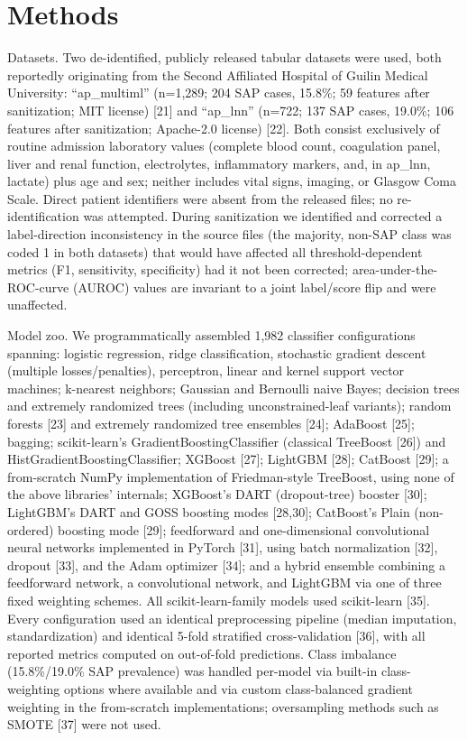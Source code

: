 \documentclass[10pt]{article} %
\begin{document}
\section{Methods}

Datasets. Two de-identified, publicly released tabular datasets were used, both reportedly originating from the Second Affiliated Hospital of Guilin Medical University: ``ap\_multiml'' (n=1,289; 204 SAP cases, 15.8\%; 59 features after sanitization; MIT license) [21] and ``ap\_lnn'' (n=722; 137 SAP cases, 19.0\%; 106 features after sanitization; Apache-2.0 license) [22]. Both consist exclusively of routine admission laboratory values (complete blood count, coagulation panel, liver and renal function, electrolytes, inflammatory markers, and, in ap\_lnn, lactate) plus age and sex; neither includes vital signs, imaging, or Glasgow Coma Scale. Direct patient identifiers were absent from the released files; no re-identification was attempted. During sanitization we identified and corrected a label-direction inconsistency in the source files (the majority, non-SAP class was coded 1 in both datasets) that would have affected all threshold-dependent metrics (F1, sensitivity, specificity) had it not been corrected; area-under-the-ROC-curve (AUROC) values are invariant to a joint label/score flip and were unaffected.

Model zoo. We programmatically assembled 1,982 classifier configurations spanning: logistic regression, ridge classification, stochastic gradient descent (multiple losses/penalties), perceptron, linear and kernel support vector machines; k-nearest neighbors; Gaussian and Bernoulli naive Bayes; decision trees and extremely randomized trees (including unconstrained-leaf variants); random forests [23] and extremely randomized tree ensembles [24]; AdaBoost [25]; bagging; scikit-learn's GradientBoostingClassifier (classical TreeBoost [26]) and HistGradientBoostingClassifier; XGBoost [27]; LightGBM [28]; CatBoost [29]; a from-scratch NumPy implementation of Friedman-style TreeBoost, using none of the above libraries' internals; XGBoost's DART (dropout-tree) booster [30]; LightGBM's DART and GOSS boosting modes [28,30]; CatBoost's Plain (non-ordered) boosting mode [29]; feedforward and one-dimensional convolutional neural networks implemented in PyTorch [31], using batch normalization [32], dropout [33], and the Adam optimizer [34]; and a hybrid ensemble combining a feedforward network, a convolutional network, and LightGBM via one of three fixed weighting schemes. All scikit-learn-family models used scikit-learn [35]. Every configuration used an identical preprocessing pipeline (median imputation, standardization) and identical 5-fold stratified cross-validation [36], with all reported metrics computed on out-of-fold predictions. Class imbalance (15.8\%/19.0\% SAP prevalence) was handled per-model via built-in class-weighting options where available and via custom class-balanced gradient weighting in the from-scratch implementations; oversampling methods such as SMOTE [37] were not used.
\end{document}

